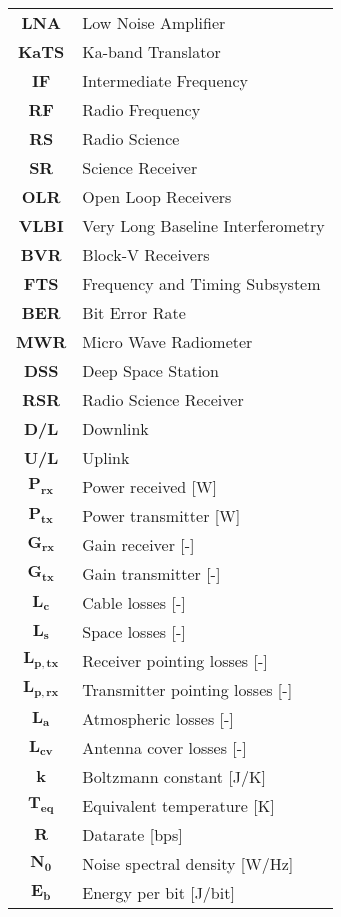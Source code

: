 \begin{multicols}{2}
{\begin{xltabular}{\linewidth}{c>{\raggedright\arraybackslash}X}
		\textbf{LNA} & Low Noise Amplifier \\
		\textbf{KaTS} & Ka-band Translator \\
		\textbf{IF} & Intermediate Frequency \\
		\textbf{RF} & Radio Frequency \\
		\textbf{RS} & Radio Science \\
		\textbf{SR} & Science Receiver\\
		\textbf{OLR} & Open Loop Receivers \\
		\textbf{VLBI} & Very Long Baseline Interferometry \\
		\textbf{BVR} & Block-V Receivers \\
		\textbf{FTS} & Frequency and Timing Subsystem \\
		\textbf{BER} & Bit Error Rate \\ 
		\textbf{MWR} & Micro Wave Radiometer \\ 
		\textbf{DSS} & Deep Space Station \\
		\textbf{RSR} & Radio Science Receiver \\
		\textbf{D/L} & Downlink \\
		\textbf{U/L} & Uplink \\
		$\boldsymbol{P_{rx}}$ & Power received [W] \\
		$\boldsymbol{P_{tx}}$ & Power transmitter [W] \\
		$\boldsymbol{G_{rx}}$ & Gain receiver [-] \\
		$\boldsymbol{G_{tx}}$ & Gain transmitter [-] \\
		$\boldsymbol{L_c}$ & Cable losses [-] \\
		$\boldsymbol{L_s}$ & Space losses [-] \\
		$\boldsymbol{L_{p,tx}}$ & Receiver pointing losses [-] \\
		$\boldsymbol{L_{p,rx}}$ & Transmitter pointing losses [-] \\
		$\boldsymbol{L_{a}}$ & Atmospheric losses [-] \\
		$\boldsymbol{L_{cv}}$ & Antenna cover losses [-] \\
		$\boldsymbol{k}$ & Boltzmann constant [J/K] \\
		$\boldsymbol{T_{eq}}$ & Equivalent temperature [K] \\
		$\boldsymbol{R}$ & Datarate [bps] \\
		$\boldsymbol{N_{0}}$ & Noise spectral density [W/Hz] \\
		$\boldsymbol{E_b}$ & Energy per bit [J/bit] \\

\end{xltabular}}
\end{multicols}
